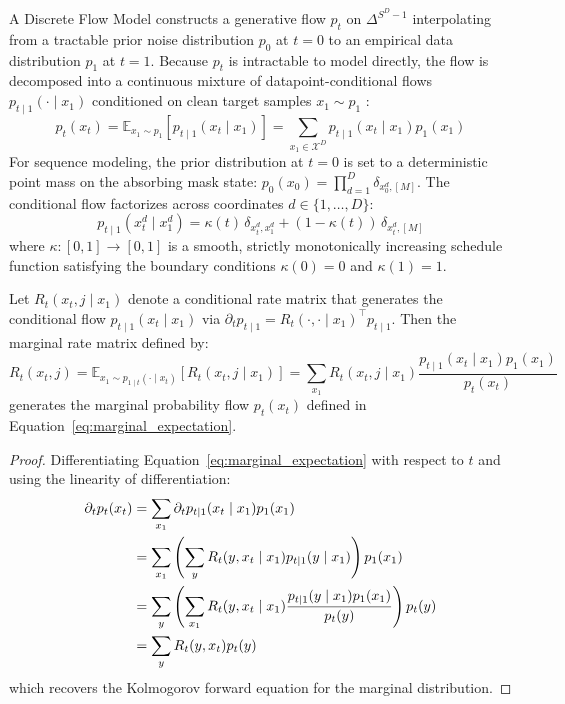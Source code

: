A Discrete Flow Model constructs a generative flow $p_t$ on $\Delta^{S^D - 1}$ interpolating from a tractable prior noise distribution $p_0$ at $t = 0$ to an empirical data distribution $p_1$ at $t = 1$. Because $p_t$ is intractable to model directly, the flow is decomposed into a continuous mixture of datapoint-conditional flows $p_{t \mid 1}(\cdot \mid x_1)$ conditioned on clean target samples $x_1 \sim p_1$ \citep{Campbell2024}:
\begin{equation}
p_t(x_t) = \mathbb{E}_{x_1 \sim p_1} \left[ p_{t \mid 1}(x_t \mid x_1) \right] = \sum_{x_1 \in \mathcal{X}^D} p_{t \mid 1}(x_t \mid x_1) p_1(x_1)
\label{eq:marginal_expectation}
\end{equation}
For sequence modeling, the prior distribution at $t = 0$ is set to a deterministic point mass on the absorbing mask state: $p_0(x_0) = \prod_{d=1}^D \delta_{x_0^d, [M]}$. The conditional flow factorizes across coordinates $d \in \{1, \dots, D\}$:
\begin{equation}
p_{t \mid 1}(x_t^d \mid x_1^d) = \kappa(t) \, \delta_{x_t^d, x_1^d} + (1 - \kappa(t)) \, \delta_{x_t^d, [M]}
\label{eq:conditional_mask_flow}
\end{equation}
where $\kappa: [0, 1] \to [0, 1]$ is a smooth, strictly monotonically increasing schedule function satisfying the boundary conditions $\kappa(0) = 0$ and $\kappa(1) = 1$.

\begin{pro}
Let $R_t(x_t, j \mid x_1)$ denote a conditional rate matrix that generates the conditional flow $p_{t \mid 1}(x_t \mid x_1)$ via $\partial_t p_{t \mid 1} = R_t(\cdot, \cdot \mid x_1)^\top p_{t \mid 1}$. Then the marginal rate matrix defined by:
\begin{equation}
R_t(x_t, j) = \mathbb{E}_{x_1 \sim p_{1 \mid t}(\cdot \mid x_t)} \left[ R_t(x_t, j \mid x_1) \right] = \sum_{x_1} R_t(x_t, j \mid x_1) \frac{p_{t \mid 1}(x_t \mid x_1) p_1(x_1)}{p_t(x_t)}
\label{eq:campbell_prop31}
\end{equation}
generates the marginal probability flow $p_t(x_t)$ defined in Equation~\ref{eq:marginal_expectation}.
\end{pro}

\begin{proof}
Differentiating Equation~\ref{eq:marginal_expectation} with respect to $t$ and using the linearity of differentiation:
\begin{align}
\partial_t p_t(x_t) &= \sum_{x_1} \partial_t p_{t \mid 1}(x_t \mid x_1) p_1(x_1) \notag \\
&= \sum_{x_1} \left( \sum_{y} R_t(y, x_t \mid x_1) p_{t \mid 1}(y \mid x_1) \right) p_1(x_1) \notag \\
&= \sum_{y} \left( \sum_{x_1} R_t(y, x_t \mid x_1) \frac{p_{t \mid 1}(y \mid x_1) p_1(x_1)}{p_t(y)} \right) p_t(y) \notag \\
&= \sum_{y} R_t(y, x_t) p_t(y)
\end{align}
which recovers the Kolmogorov forward equation for the marginal distribution.
\end{proof}

